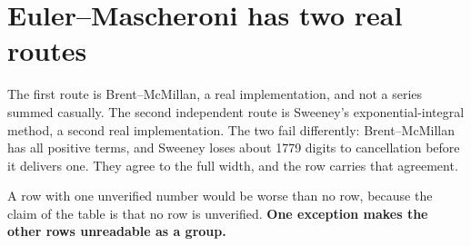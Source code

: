\section{Euler--Mascheroni has two real routes}

The first route is Brent--McMillan, a real implementation, and not a series summed casually. The second
independent route is Sweeney's exponential-integral method, a second real implementation. The two fail
differently: Brent--McMillan has all positive terms, and Sweeney loses about 1779 digits to cancellation
before it delivers one. They agree to the full width, and the row carries that agreement.

A row with one unverified number would be worse than no row, because the claim of the table is that
no row is unverified. \textbf{One exception makes the other rows unreadable as a group.}
